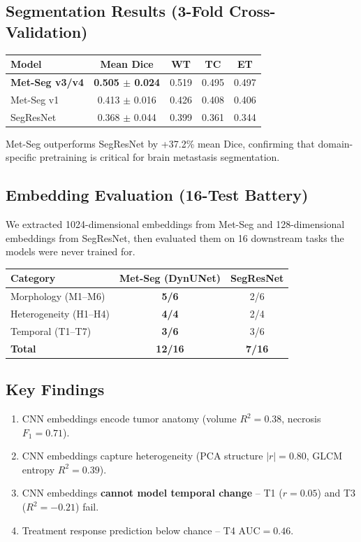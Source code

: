 \documentclass[10pt,a4paper]{article}
\begin{document}
\subsection*{Segmentation Results (3-Fold Cross-Validation)}

\begin{center}
\begin{tabular}{lcccc}
\toprule
\textbf{Model} & \textbf{Mean Dice} & \textbf{WT} & \textbf{TC} & \textbf{ET} \\
\midrule
\textbf{Met-Seg v3/v4} & \textbf{0.505 $\pm$ 0.024} & 0.519 & 0.495 & 0.497 \\
Met-Seg v1 & 0.413 $\pm$ 0.016 & 0.426 & 0.408 & 0.406 \\
SegResNet & 0.368 $\pm$ 0.044 & 0.399 & 0.361 & 0.344 \\
\bottomrule
\end{tabular}
\end{center}

Met-Seg outperforms SegResNet by +37.2\% mean Dice, confirming that domain-specific pretraining is critical for brain metastasis segmentation.

\subsection*{Embedding Evaluation (16-Test Battery)}

We extracted 1024-dimensional embeddings from Met-Seg and 128-dimensional embeddings from SegResNet, then evaluated them on 16 downstream tasks the models were never trained for.

\begin{center}
\begin{tabular}{lcc}
\toprule
\textbf{Category} & \textbf{Met-Seg (DynUNet)} & \textbf{SegResNet} \\
\midrule
Morphology (M1--M6) & \textbf{5/6} & 2/6 \\
Heterogeneity (H1--H4) & \textbf{4/4} & 2/4 \\
Temporal (T1--T7) & \textbf{3/6} & 3/6 \\
\midrule
\textbf{Total} & \textbf{12/16} & \textbf{7/16} \\
\bottomrule
\end{tabular}
\end{center}

\subsection*{Key Findings}
\begin{enumerate}[nosep, leftmargin=1.5em]
    \item CNN embeddings encode tumor anatomy (volume $R^2=0.38$, necrosis $F_1=0.71$).
    \item CNN embeddings capture heterogeneity (PCA structure $|r|=0.80$, GLCM entropy $R^2=0.39$).
    \item CNN embeddings \textbf{cannot model temporal change} -- T1 ($r=0.05$) and T3 ($R^2=-0.21$) fail.
    \item Treatment response prediction below chance -- T4 $\text{AUC}=0.46$.
\end{enumerate}
\end{document}
